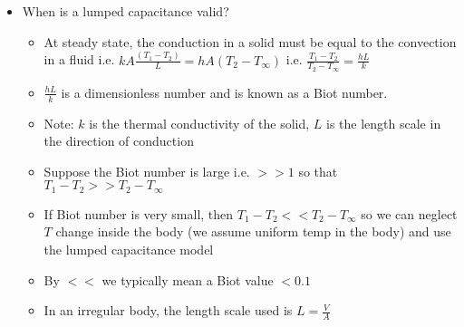 \documentclass[12pt]{article}
\begin{document}
\begin{itemize}
    \item When is a lumped capacitance valid? \begin{itemize}
        \item At steady state, the conduction in a solid must be equal to the convection in a fluid i.e. $kA \frac{(T_1 - T_2)}{L} = hA (T_2 - T_{\infty})$ i.e. $\frac{T_1 - T_2}{T_2 - T_{\infty}} = \frac{hL}{k}$
        \item $\frac{hL}{k}$ is a dimensionless number and is known as a Biot number. 
        \item Note: $k$ is the thermal conductivity of the solid, $L$ is the length scale in the direction of conduction
        \item Suppose the Biot number is large i.e. $>> 1$ so that $T_1 - T_2 >> T_2 - T_{\infty}$
        \item If Biot number is very small, then $T_1 - T_2 << T_2 - T_{\infty}$ so we can neglect $T$ change inside the body (we assume uniform temp in the body) and use the lumped capacitance model
        \item By $<<$ we typically mean a Biot value $<0.1$
        \item In an irregular body, the length scale used is $L = \frac{V}{A}$
    \end{itemize}
\end{itemize}
\end{document}
